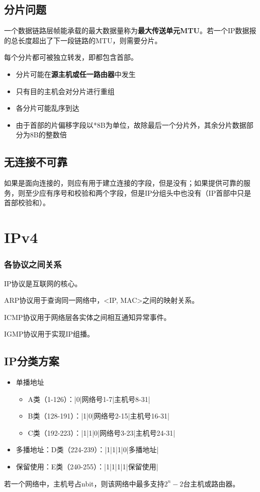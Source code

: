 \subsection{分片问题}
一个数据链路层帧能承载的最大数据量称为\textbf{最大传送单元MTU}。若一个IP数据报的总长度超出了下一段链路的MTU，则需要分片。

每个分片都可被独立转发，即都包含首部。
\begin{itemize}
    \item 分片可能在\textbf{源主机或任一路由器}中发生
    \item 只有目的主机会对分片进行重组
    \item 各分片可能乱序到达
    \item 由于首部的片偏移字段以*8B为单位，故除最后一个分片外，其余分片数据部分为8B的整数倍
\end{itemize}


\subsection{无连接不可靠}
如果是面向连接的，则应有用于建立连接的字段，但是没有；如果提供可靠的服务，则至少应有序号和校验和两个字段，但是IP分组头中也没有（IP首部中只是首部校验和）。


\section{IPv4}

\subsubsection{各协议之间关系}

IP协议是互联网的核心。

ARP协议用于查询同一网络中，<IP, MAC>之间的映射关系。

ICMP协议用于网络层各实体之间相互通知异常事件。

IGMP协议用于实现IP组播。


\subsection{IP分类方案}
\begin{itemize}
    \item 单播地址\begin{itemize}
        \item A类（1-126）：|0|网络号1-7|主机号8-31|
        \item B类（128-191）：|1|0|网络号2-15|主机号16-31|
        \item C类（192-223）：|1|1|0|网络号3-23|主机号24-31|
    \end{itemize}
    \item 多播地址：D类（224-239）：|1|1|1|0|多播地址|
    \item 保留使用：E类（240-255）：|1|1|1|1|保留使用|
\end{itemize}
若一个网络中，主机号占nbit，则该网络中最多支持\(2^n - 2\)台主机或路由器。

